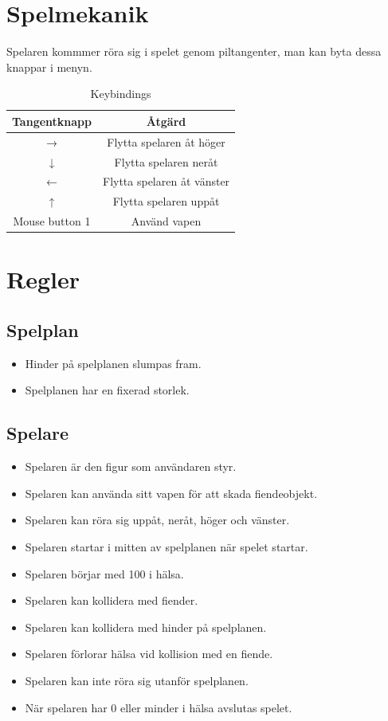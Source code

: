 \documentclass{TDP005mall}
\begin{document}
\section{Spelmekanik}
Spelaren kommmer röra sig i spelet genom piltangenter, man kan byta dessa knappar i menyn.
\begin{table}[H]
  \begin{center}
  \begin{tabular}{ |c|c| } 
    \hline
    \textbf{Tangentknapp} & \textbf{Åtgärd} \\
    \hline
    → & Flytta spelaren åt höger \\
    \hline
    ↓ & Flytta spelaren neråt \\
    \hline
    ← & Flytta spelaren åt vänster \\
    \hline
    ↑ & Flytta spelaren uppåt \\
    \hline
    Mouse button 1 & Använd vapen \\
    \hline
  \end{tabular}
  \end{center}
  \caption{Keybindings}
  \label{tab:movement}
\end{table}

\section{Regler}
\subsection{Spelplan}
\begin{itemize}
\item Hinder på spelplanen slumpas fram.
\item Spelplanen har en fixerad storlek.
\end{itemize}

\subsection{Spelare}
\begin{itemize}
\item Spelaren är den figur som användaren styr.
\item Spelaren kan använda sitt vapen för att skada fiendeobjekt.
\item Spelaren kan röra sig uppåt, neråt, höger och vänster.
\item Spelaren startar i mitten av spelplanen när spelet startar.
\item Spelaren börjar med 100 i hälsa.
\item Spelaren kan kollidera med fiender.
\item Spelaren kan kollidera med hinder på spelplanen.
\item Spelaren förlorar hälsa vid kollision med en fiende.
\item Spelaren kan inte röra sig utanför spelplanen.
\item När spelaren har 0 eller minder i hälsa avslutas spelet.
\end{itemize}
\end{document}

